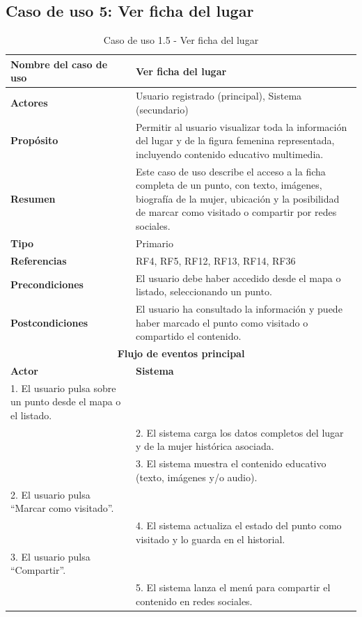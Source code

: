 \subsection{Caso de uso 5: Ver ficha del lugar}

\begin{table}[H]
\centering
\caption{Caso de uso 1.5 - Ver ficha del lugar}
\begin{tabular}{|p{4.5cm}|p{10.5cm}|}
\hline
\textbf{Nombre del caso de uso} & Ver ficha del lugar \\
\hline
\textbf{Actores} & Usuario registrado (principal), Sistema (secundario) \\
\hline
\textbf{Propósito} & Permitir al usuario visualizar toda la información del lugar y de la figura femenina representada, incluyendo contenido educativo multimedia. \\
\hline
\textbf{Resumen} & Este caso de uso describe el acceso a la ficha completa de un punto, con texto, imágenes, biografía de la mujer, ubicación y la posibilidad de marcar como visitado o compartir por redes sociales. \\
\hline
\textbf{Tipo} & Primario \\
\hline
\textbf{Referencias} & RF4, RF5, RF12, RF13, RF14, RF36 \\
\hline
\textbf{Precondiciones} & El usuario debe haber accedido desde el mapa o listado, seleccionando un punto. \\
\hline
\textbf{Postcondiciones} & El usuario ha consultado la información y puede haber marcado el punto como visitado o compartido el contenido. \\
\hline
\multicolumn{2}{|c|}{\textbf{Flujo de eventos principal}} \\
\hline
\textbf{Actor} & \textbf{Sistema} \\
\hline
1. El usuario pulsa sobre un punto desde el mapa o el listado. & \\
\hline
& 2. El sistema carga los datos completos del lugar y de la mujer histórica asociada. \\
\hline
& 3. El sistema muestra el contenido educativo (texto, imágenes y/o audio). \\
\hline
2. El usuario pulsa “Marcar como visitado”. & \\
\hline
& 4. El sistema actualiza el estado del punto como visitado y lo guarda en el historial. \\
\hline
3. El usuario pulsa “Compartir”. & \\
\hline
& 5. El sistema lanza el menú para compartir el contenido en redes sociales. \\
\hline
\end{tabular}
\end{table}

